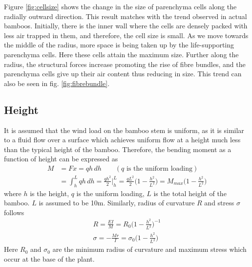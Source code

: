 \documentclass[openright,twoside]{iitkthesis}
\begin{document}
Figure \ref{fig:cellsize} shows the change in the size of parenchyma cells along the radially outward direction. This result matches with the trend observed in actual bamboos. Initially, there is the inner wall where the cells are densely packed with less air trapped in them, and therefore, the cell size is small. As we move towards the middle of the radius, more space is being taken up by the life-supporting parenchyma cells. Here these cells attain the maximum size. Further along the radius, the structural forces increase promoting the rise of fibre bundles, and the parenchyma cells give up their air content thus reducing in size. This trend can also be seen in fig. \ref{fig:fibrebundle}.
\clearpage
\subsection{Height}
It is assumed that the wind load on the bamboo stem is uniform, as it is similar to a fluid flow over a surface which achieves uniform flow at a height much less than the typical height of the bamboo. Therefore, the bending moment as a function of height can be expressed as
\begin{equation}
\begin{split}
M &= Fx = qh\,dh \qquad (q \text{ is the uniform loading})\\
&= \int_{h}^Lqh\,dh = \frac{qh^2}{2}\bigg|^L_h = \frac{qL^2}{2}\bigg(1-\frac{h^2}{L^2}\bigg) = M_{max}\bigg(1-\frac{h^2}{L^2}\bigg)
\end{split}
\end{equation}
where $h$ is the height, $q$ is the uniform loading, $L$ is the total height of the bamboo. $L$ is assumed to be 10m.
Similarly, radius of curvature $R$ and stress $\sigma$ follows
\begin{eqnarray}
R = \frac{EI}{M} = R_0\bigg(1-\frac{h^2}{L^2}\bigg)^{-1}\\
\sigma = -\frac{Mr}{I} = \sigma_0\bigg(1-\frac{h^2}{L^2}\bigg)
\end{eqnarray}
Here $R_0$ and $\sigma_0$ are the minimum radius of curvature and maximum stress which occur at the base of the plant. 
\vspace{-1cm}
\end{document}
